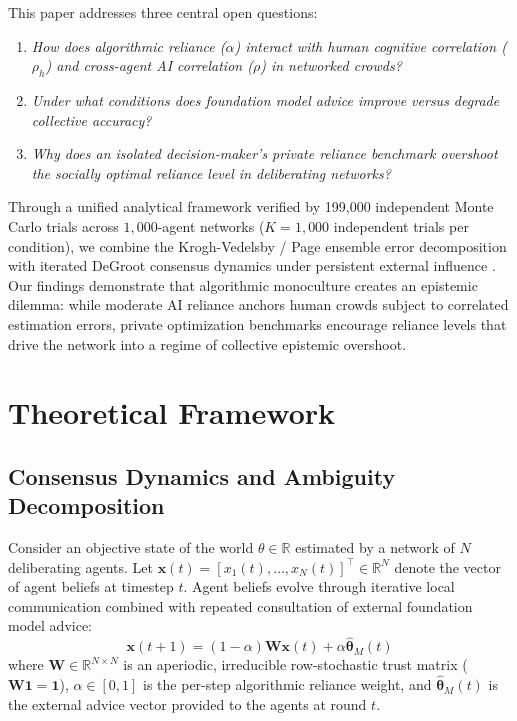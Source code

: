 \documentclass
[letterpaper]{article}
\begin{document}
This paper addresses three central open questions:
\begin{enumerate}\setlength{\itemsep}{0pt}\setlength{\parskip}{0pt}\setlength{\parsep}{0pt}
    \item \textit{How does algorithmic reliance ($\alpha$) interact with human cognitive correlation ($\rho_h$) and cross-agent AI correlation ($\rho$) in networked crowds?}
    \item \textit{Under what conditions does foundation model advice improve versus degrade collective accuracy?}
    \item \textit{Why does an isolated decision-maker's private reliance benchmark overshoot the socially optimal reliance level in deliberating networks?}
\end{enumerate}

Through a unified analytical framework verified by 199,000 independent Monte Carlo trials across $1,000$-agent networks ($K = 1,000$ independent trials per condition), we combine the Krogh-Vedelsby / Page ensemble error decomposition \citep{krogh1995neural, page2007difference} with iterated DeGroot consensus dynamics under persistent external influence \citep{degroot1974reaching, friedkin1990social, acemoglu2013opinion}. Our findings demonstrate that algorithmic monoculture creates an epistemic dilemma: while moderate AI reliance anchors human crowds subject to correlated estimation errors, private optimization benchmarks encourage reliance levels that drive the network into a regime of collective epistemic overshoot.

\section{Theoretical Framework}

\subsection{Consensus Dynamics and Ambiguity Decomposition}
\label{sec:consensus_dynamics}
Consider an objective state of the world $\theta \in \mathbb{R}$ estimated by a network of $N$ deliberating agents. Let $\mathbf{x}(t) = [x_1(t), \dots, x_N(t)]^\top \in \mathbb{R}^N$ denote the vector of agent beliefs at timestep $t$. Agent beliefs evolve through iterative local communication combined with repeated consultation of external foundation model advice:
\begin{equation}
\mathbf{x}(t+1) = (1 - \alpha) \mathbf{W} \mathbf{x}(t) + \alpha \hat{\boldsymbol{\theta}}_M(t)
\label{eq:hybrid_degroot}
\end{equation}
where $\mathbf{W} \in \mathbb{R}^{N \times N}$ is an aperiodic, irreducible row-stochastic trust matrix ($\mathbf{W}\mathbf{1} = \mathbf{1}$), $\alpha \in [0, 1]$ is the per-step algorithmic reliance weight, and $\hat{\boldsymbol{\theta}}_M(t)$ is the external advice vector provided to the agents at round $t$. 
\end{document}
